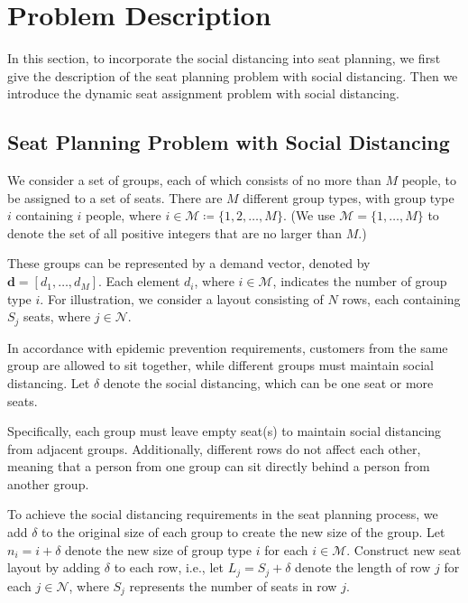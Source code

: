 \section{Problem Description}
In this section, to incorporate the social distancing into seat planning, we first give the description of the seat planning problem with social distancing. Then we introduce the dynamic seat assignment problem with social distancing.


\subsection{Seat Planning Problem with Social Distancing}\label{dynamic_demand}
We consider a set of groups, each of which consists of no more than $M$ people, to be assigned to a set of seats. There are $M$ different group types, with group type $i$ containing $i$ people, where $i \in \mathcal{M} \coloneqq \{1,2, \ldots, M\}$. (We use $\mathcal{M} = \{1, \ldots, M\}$ to denote the set of all positive integers that are no larger than $M$.)

These groups can be represented by a demand vector, denoted by $\mathbf{d} = [d_1, \ldots, d_M]$. Each element $d_i$, where $i \in \mathcal{M}$, indicates the number of group type $i$. For illustration, we consider a layout consisting of $N$ rows, each containing $S_j$ seats, where $j \in \mathcal{N}$.

In accordance with epidemic prevention requirements, customers from the same group are allowed to sit together, while different groups must maintain social distancing. Let $\delta$ denote the social distancing, which can be one seat or more seats.

Specifically, each group must leave empty seat(s) to maintain social distancing from adjacent groups. Additionally, different rows do not affect each other, meaning that a person from one group can sit directly behind a person from another group.


To achieve the social distancing requirements in the seat planning process, we add $\delta$ to the original size of each group to create the new size of the group. Let $n_i = i + \delta$ denote the new size of group type $i$ for each $i \in \mathcal{M}$. Construct new seat layout by adding $\delta$ to each row, i.e., let $L_j = S_j + \delta$ denote the length of row $j$ for each $j \in \mathcal{N}$, where $S_j$ represents the number of seats in row $j$.


